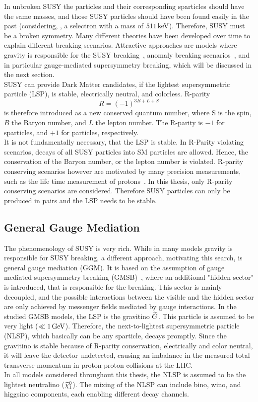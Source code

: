 In unbroken SUSY the particles and their corresponding sparticles should have the same masses, and those SUSY particles should have been found easily in the past (considering, \eg, a selectron with a mass of $511\,\text{ke\hspace{-.08em}V}$). Therefore, SUSY must be a broken symmetry. Many different theories have been developed over time to explain different breaking scenarios. Attractive approaches are models where gravity is responsible for the SUSY breaking~\cite{SUSYPrimer}, anomaly breaking scenarios~\cite{AMSB}, and in particular gauge-mediated supersymmetry breaking, which will be discussed in the next section.\\
SUSY can provide Dark Matter candidates, if the lightest supersymmetric particle (LSP), is stable, electrically neutral, and colorless.
R-parity
\begin{equation}
 R = (-1)^{3B+L+S}
\end{equation}
is therefore introduced as a new conserved quantum number, where S is the spin, $B$ the Baryon number, and $L$ the lepton number. The R-parity is $-1$ for sparticles, and $+1$ for particles, respectively.\\
It is not fundamentally necessary, that the LSP is stable. In R-Parity violating scenarios, decays of all SUSY particles into SM particles are allowed. Hence, the conservation of the Baryon number, or the lepton number is violated. R-parity conserving scenarios however are motivated by many precision measurements, such as the life time measurement of protons~\cite{ProtonDecay}.
In this thesis, only R-parity conserving scenarios are considered. Therefore SUSY particles can only be produced in pairs and the LSP needs to be stable.\\



\subsection{General Gauge Mediation}\label{sec:GGM}
The phenomenology of SUSY is very rich. While in many models gravity is responsible for SUSY breaking, a different approach, motivating this search, is general gauge mediation (GGM). It is based on the assumption of gauge mediated supersymmetry breaking (GMSB)~\cite{GGM}, where an additional "hidden sector" is introduced, that is responsible for the breaking. This sector is mainly decoupled, and the possible interactions between the visible and the hidden sector are only achieved by messenger fields mediated by gauge interactions. In the studied GMSB models, the LSP is the gravitino $\widetilde{G}$. This particle is assumed to be very light ($\ll1\,\text{Ge\hspace{-.08em}V}$). Therefore, the next-to-lightest supersymmetric particle (NLSP), which basically can be any sparticle, decays promptly. Since the gravitino is stable because of R-parity conservation, electrically and color neutral, it will leave the detector undetected, causing an imbalance in the measured total transverse momentum in proton-proton collisions at the LHC.\\
In all models considered throughout this thesis, the NLSP is assumed to be the lightest neutralino ($\widetilde{\chi}^{0}_{1}$). The mixing of the NLSP can include bino, wino, and higgsino components, each enabling different decay channels.


